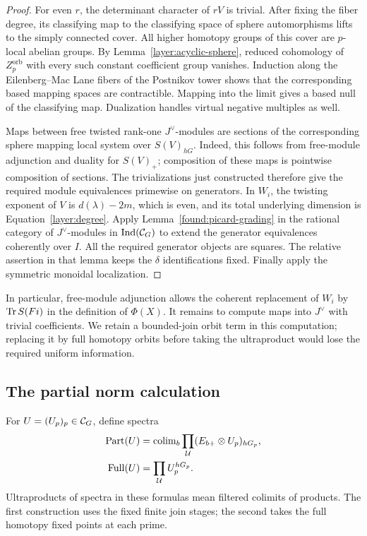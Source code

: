 \begin{proof}
For even $r$, the determinant character of $rV$ is trivial. After
fixing the fiber degree, its classifying map to the classifying space
of sphere automorphisms lifts to the simply connected cover. All
higher homotopy groups of this cover are $p$-local abelian groups.
By Lemma~\ref{layer:acyclic-sphere}, reduced cohomology of
$Z_p^{\mathrm{orb}}$ with every such constant coefficient group
vanishes. Induction along the Eilenberg--Mac Lane fibers of the
Postnikov tower shows that the corresponding based mapping spaces
are contractible. Mapping into the limit gives a based null of the
classifying map. Dualization handles virtual negative multiples as
well.

Maps between free twisted rank-one $J^\vee$-modules are sections of
the corresponding sphere mapping local system over
$S(V)_{hG}$. Indeed, this follows from free-module adjunction and
duality for $S(V)_+$; composition of these maps is pointwise
composition of sections. The trivializations just constructed
therefore give the required module equivalences primewise on
generators. In $W_i$, the twisting exponent of $V$ is
$d(\lambda)-2m$, which is even, and its total underlying dimension
is Equation~\eqref{layer:degree}. Apply
Lemma~\ref{found:picard-grading} in the rational category of
$J^\vee$-modules in $\mathrm{Ind}(\mathcal C_G)$ to extend the generator
equivalences coherently over $I$. All the required generator objects
are squares. The relative assertion in that lemma keeps the
$\delta$ identifications fixed. Finally apply the symmetric
monoidal localization.
\end{proof}

In particular, free-module adjunction allows the coherent replacement
of $W_i$ by $\operatorname{Tr} S(Fi)$ in the definition of $\Phi(X)$. It remains
to compute maps into $J^\vee$ with trivial coefficients. We retain a
bounded-join orbit term in this computation; replacing it by full
homotopy orbits before taking the ultraproduct would lose the required
uniform information.

\subsection{The partial norm calculation}

For $U=(U_p)_p\in\mathcal C_G$, define spectra
\[
 \begin{split}
 \operatorname{Part}(U)
 &=\operatorname{colim}_b\prod_{\mathcal U}(E_{b+}\otimes U_p)_{hG_p},\\
 \operatorname{Full}(U)
 &=\prod_{\mathcal U}U_p^{hG_p}.
 \end{split}
\]
Ultraproducts of spectra in these formulas mean filtered colimits of
products. The first construction uses the fixed finite join stages;
the second takes the full homotopy fixed points at each prime.

